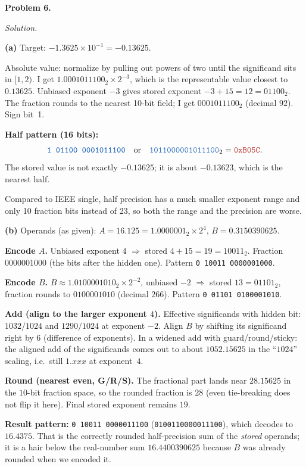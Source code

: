\documentclass[12pt]{article}
\newcommand{\problem}[1]{\vspace{0.8em}\noindent\textbf{Problem #1.}\vspace{0.35em}}
\newenvironment{solution}{\par\noindent\textit{Solution.}\ }{\par\vspace{1.1em}}
\newcommand{\subproblem}[1]{\par\vspace{0.45em}\noindent\textbf{(#1)}\quad}
\newcommand{\bits}[1]{\texttt{\textcolor{NavyBlue}{#1}}}
\newcommand{\hexv}[1]{\texttt{\textcolor{BrickRed}{#1}}}
\begin{document}
\problem{6}
\begin{solution}
\subproblem{a}
Target: $-1.3625\times 10^{-1} = -0.13625$.

Absolute value: normalize by pulling out powers of two until the significand sits in $[1,2)$. I get $1.0001011100_2 \times 2^{-3}$, which is the representable value closest to $0.13625$. Unbiased exponent $-3$ gives stored exponent $-3+15=12=01100_2$. The fraction rounds to the nearest 10-bit field; I get $0001011100_2$ (decimal $92$). Sign bit~1.

\textbf{Half pattern (16 bits):}
\[
\textbf{\bits{1\ 01100\ 0001011100}}
\quad\text{or}\quad
\bits{1011000001011100}_2 = \hexv{0xB05C}.
\]
The stored value is not exactly $-0.13625$; it is about $-0.13623$, which is the nearest half.

Compared to IEEE single, half precision has a much smaller exponent range and only 10 fraction bits instead of 23, so both the range and the precision are worse.

\subproblem{b}
Operands (as given): $A=16.125=1.0000001_2\times 2^4$, $B=0.3150390625$.

\textbf{Encode $A$.} Unbiased exponent $4$ $\Rightarrow$ stored $4+15=19=10011_2$. Fraction $0000001000$ (the bits after the hidden one). Pattern \bits{0\,10011\,0000001000}.

\textbf{Encode $B$.} $B\approx 1.0100001010_2\times 2^{-2}$, unbiased $-2$ $\Rightarrow$ stored $13=01101_2$, fraction rounds to $0100001010$ (decimal $266$). Pattern \bits{0\,01101\,0100001010}.

\textbf{Add (align to the larger exponent $4$).} Effective significands with hidden bit: $1032/1024$ and $1290/1024$ at exponent $-2$. Align $B$ by shifting its significand right by $6$ (difference of exponents). In a widened add with guard/round/sticky: the aligned add of the significands comes out to about $1052.15625$ in the ``$1024$'' scaling, i.e.\ still $1.xxx$ at exponent~$4$.

\textbf{Round (nearest even, G/R/S).} The fractional part lands near $28.15625$ in the $10$-bit fraction space, so the rounded fraction is $28$ (even tie-breaking does not flip it here). Final stored exponent remains $19$.

\textbf{Result pattern:} \bits{0\,10011\,0000011100} (\bits{0100110000011100}), which decodes to $16.4375$. That is the correctly rounded half-precision sum of the \emph{stored} operands; it is a hair below the real-number sum $16.4400390625$ because $B$ was already rounded when we encoded it.
\end{solution}
\end{document}
